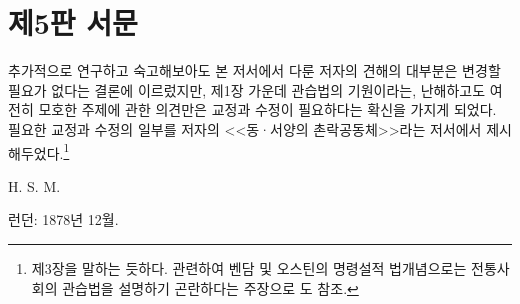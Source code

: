 \chapter*{제5판 서문}

추가적으로 연구하고 숙고해보아도
본 저서에서 다룬 저자의 견해의 대부분은
변경할 필요가 없다는 결론에 이르렀지만,
제1장 가운데
관습법의 기원이라는, 난해하고도 여전히 모호한 주제에 관한 의견만은
교정과 수정이 필요하다는 확신을 가지게 되었다.
필요한 교정과 수정의 일부를
저자의
<<동·서양의 촌락공동체>>라는
저서에서 제시해두었다.\footnote{%
   제3장을 말하는 듯하다.
  관련하여 벤담 및 오스틴의 명령설적 법개념으로는
  전통사회의 관습법을 설명하기 곤란하다는 주장으로
  도 참조. }

\begin{flushright}
H. S. M.
\end{flushright}

\begin{footnotesize}
런던: 1878년 12월.
\end{footnotesize}

